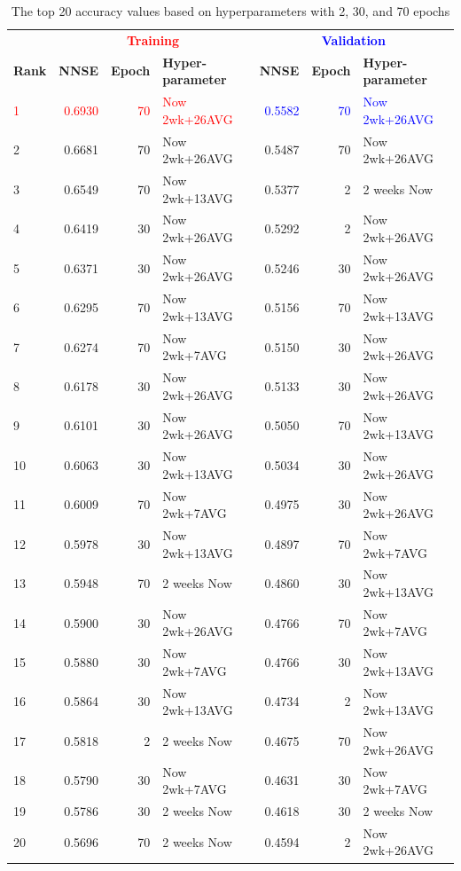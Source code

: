 \documentclass[utf8]{FrontiersinVancouver} %
\begin{document}
\begin{table}[htb]
  \caption{The top 20 accuracy values based on hyperparameters with 2, 30, and 70 epochs}
  \label{tab:ranking-accuracy}
  \renewcommand{\arraystretch}{1.2}
  \begin{center}
    {\footnotesize  
\begin{tabular}{|l||r|r|l|r|r|l|}
  \hline
 &   \multicolumn{3}{c|}{\bf \textcolor{red}{Training}}  & \multicolumn{3}{c|}{\bf \textcolor{blue}{Validation}}  \\
{\bf Rank} &  {\bf NNSE} &  {\bf Epoch} & {\bf Hyper-parameter} & {\bf NNSE} &  {\bf Epoch} & {\bf Hyper-parameter}\\
\hline
\textcolor{red}{1}  &  \textcolor{red}{0.6930} &     \textcolor{red}{70} &  \textcolor{red}{Now 2wk+26AVG} &  \textcolor{blue}{0.5582} &     \textcolor{blue}{70} &  \textcolor{blue}{Now 2wk+26AVG} \\
2  &  0.6681 &     70 &  Now 2wk+26AVG &  0.5487 &     70 &  Now 2wk+26AVG \\
3  &  0.6549 &     70 &  Now 2wk+13AVG &  0.5377 &      2 &    2 weeks Now \\
4  &  0.6419 &     30 &  Now 2wk+26AVG &  0.5292 &      2 &  Now 2wk+26AVG \\
5  &  0.6371 &     30 &  Now 2wk+26AVG &  0.5246 &     30 &  Now 2wk+26AVG \\
6  &  0.6295 &     70 &  Now 2wk+13AVG &  0.5156 &     70 &  Now 2wk+13AVG \\
7  &  0.6274 &     70 &   Now 2wk+7AVG &  0.5150 &     30 &  Now 2wk+26AVG \\
8  &  0.6178 &     30 &  Now 2wk+26AVG &  0.5133 &     30 &  Now 2wk+26AVG \\
9  &  0.6101 &     30 &  Now 2wk+26AVG &  0.5050 &     70 &  Now 2wk+13AVG \\
10 &  0.6063 &     30 &  Now 2wk+13AVG &  0.5034 &     30 &  Now 2wk+26AVG \\
11 &  0.6009 &     70 &   Now 2wk+7AVG &  0.4975 &     30 &  Now 2wk+26AVG \\
12 &  0.5978 &     30 &  Now 2wk+13AVG &  0.4897 &     70 &   Now 2wk+7AVG \\
13 &  0.5948 &     70 &    2 weeks Now &  0.4860 &     30 &  Now 2wk+13AVG \\
14 &  0.5900 &     30 &  Now 2wk+26AVG &  0.4766 &     70 &   Now 2wk+7AVG \\
15 &  0.5880 &     30 &   Now 2wk+7AVG &  0.4766 &     30 &  Now 2wk+13AVG \\
16 &  0.5864 &     30 &  Now 2wk+13AVG &  0.4734 &      2 &  Now 2wk+13AVG \\
17 &  0.5818 &      2 &    2 weeks Now &  0.4675 &     70 &  Now 2wk+26AVG \\
18 &  0.5790 &     30 &   Now 2wk+7AVG &  0.4631 &     30 &   Now 2wk+7AVG \\
19 &  0.5786 &     30 &    2 weeks Now &  0.4618 &     30 &    2 weeks Now \\
20 &  0.5696 &     70 &    2 weeks Now &  0.4594 &      2 &  Now 2wk+26AVG \\
\hline
\end{tabular}
}
\end{center}
\end{table}
\end{document}
